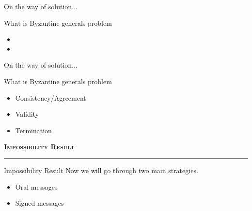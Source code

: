 \documentclass{beamer}
\begin{document}
\begin{frame}{On the way of solution...}
\begin{alertblock}{What is Byzantine generals problem}
    \begin{itemize}
        \item {}
         
        \item {}
      
    \end{itemize}    
\end{alertblock}   
\end{frame}

\begin{frame}{On the way of solution...}
\begin{alertblock}{What is Byzantine generals problem}
    \begin{itemize}
        \item {Consistency/Agreement}
        \item {Validity}
        \item {Termination}

    \end{itemize}    
\end{alertblock}   
\end{frame}

\begin{frame}[plain]
    \begin{center}
        \vfill
        {\color{red!70!black}\Huge \textbf{\textsc{Impossibility Result}}}
       
        \rule{\linewidth}{1pt}
        \vfill
    \end{center}
\end{frame}


\begin{frame}{Impossibility Result}
    Now we will go through two main strategies.
    \begin{itemize}
        \item Oral messages
        \item Signed messages
    \end{itemize}
\end{frame}
\end{document}
